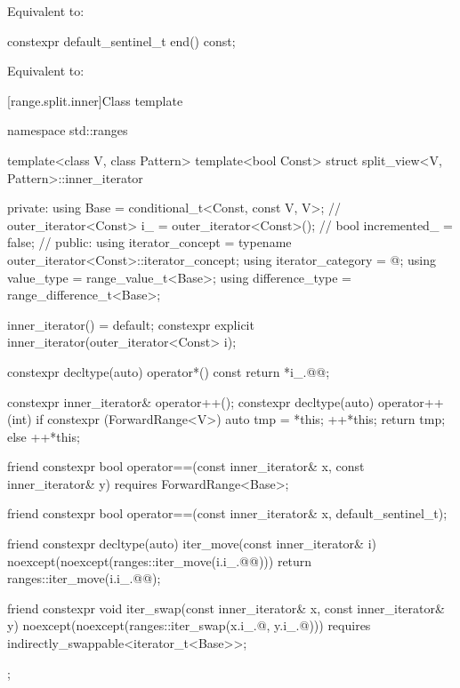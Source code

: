 \begin{itemdescr}
\pnum
\effects Equivalent to: 
\end{itemdescr}

%
\begin{itemdecl}
constexpr default_sentinel_t end() const;
\end{itemdecl}

\begin{itemdescr}
\pnum
\effects Equivalent to: 
\end{itemdescr}

[range.split.inner]{Class template }

\begin{codeblock}
namespace std::ranges {
  template<class V, class Pattern>
  template<bool Const>
  struct split_view<V, Pattern>::inner_iterator {
  private:
    using Base =
      conditional_t<Const, const V, V>;                 // \expos
    outer_iterator<Const> i_ = outer_iterator<Const>(); // \expos
    bool incremented_ = false;                          // \expos
  public:
    using iterator_concept  = typename outer_iterator<Const>::iterator_concept;
    using iterator_category = @\seebelow@;
    using value_type        = range_value_t<Base>;
    using difference_type   = range_difference_t<Base>;

    inner_iterator() = default;
    constexpr explicit inner_iterator(outer_iterator<Const> i);

    constexpr decltype(auto) operator*() const { return *i_.@@; }

    constexpr inner_iterator& operator++();
    constexpr decltype(auto) operator++(int) {
      if constexpr (ForwardRange<V>) {
        auto tmp = *this;
        ++*this;
        return tmp;
      } else
        ++*this;
    }

    friend constexpr bool operator==(const inner_iterator& x, const inner_iterator& y)
      requires ForwardRange<Base>;

    friend constexpr bool operator==(const inner_iterator& x, default_sentinel_t);

    friend constexpr decltype(auto) iter_move(const inner_iterator& i)
    noexcept(noexcept(ranges::iter_move(i.i_.@@))) {
      return ranges::iter_move(i.i_.@@);
    }

    friend constexpr void iter_swap(const inner_iterator& x, const inner_iterator& y)
      noexcept(noexcept(ranges::iter_swap(x.i_.@, y.i_.@)))
      requires indirectly_swappable<iterator_t<Base>>;
  };
}
\end{codeblock}

